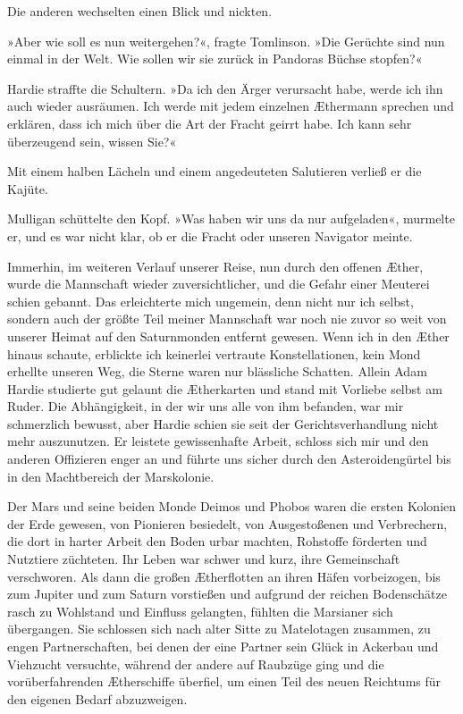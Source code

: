 Die anderen wechselten einen Blick und nickten.

»Aber wie soll es nun weitergehen?«, fragte Tomlinson. »Die
Gerüchte sind nun einmal in der Welt. Wie sollen wir sie zurück in
Pandoras Büchse stopfen?«

Hardie straffte die Schultern. »Da ich den Ärger verursacht habe,
werde ich ihn auch wieder ausräumen. Ich werde mit jedem einzelnen
Æthermann sprechen und erklären, dass ich mich über die Art der
Fracht geirrt habe. Ich kann sehr überzeugend sein, wissen Sie?«

Mit einem halben Lächeln und einem angedeuteten Salutieren verließ
er die Kajüte.

Mulligan schüttelte den Kopf. »Was haben wir uns da nur
aufgeladen«, murmelte er, und es war nicht klar, ob er die Fracht
oder unseren Navigator meinte.

\bigpar

Immerhin, im weiteren Verlauf unserer Reise, nun durch den offenen
Æther, wurde die Mannschaft wieder zuversichtlicher, und die Gefahr
einer Meuterei schien gebannt. Das erleichterte mich ungemein, denn
nicht nur ich selbst, sondern auch der größte Teil meiner
Mannschaft war noch nie zuvor so weit von unserer Heimat auf den
Saturnmonden entfernt gewesen. Wenn ich in den Æther hinaus
schaute, erblickte ich keinerlei vertraute Konstellationen, kein
Mond erhellte unseren Weg, die Sterne waren nur blässliche
Schatten. Allein Adam Hardie studierte gut gelaunt die Ætherkarten
und stand mit Vorliebe selbst am Ruder. Die Abhängigkeit, in der
wir uns alle von ihm befanden, war mir schmerzlich bewusst, aber
Hardie schien sie seit der Gerichtsverhandlung nicht mehr
auszunutzen. Er leistete gewissenhafte Arbeit, schloss sich mir und
den anderen Offizieren enger an und führte uns sicher durch den
Asteroidengürtel bis in den Machtbereich der Marskolonie.

\bigpar

Der Mars und seine beiden Monde Deimos und Phobos waren die ersten
Kolonien der Erde gewesen, von Pionieren besiedelt, von
Ausgestoßenen und Verbrechern, die dort in harter Arbeit den Boden
urbar machten, Rohstoffe förderten und Nutztiere züchteten. Ihr
Leben war schwer und kurz, ihre Gemeinschaft verschworen. Als dann
die großen Ætherflotten an ihren Häfen vorbeizogen, bis zum Jupiter
und zum Saturn vorstießen und aufgrund der reichen Bodenschätze
rasch zu Wohlstand und Einfluss gelangten, fühlten die Marsianer
sich übergangen. Sie schlossen sich nach alter Sitte zu Matelotagen
zusammen, zu engen Partnerschaften, bei denen der eine Partner sein
Glück in Ackerbau und Viehzucht versuchte, während der andere auf
Raubzüge ging und die vorüberfahrenden Ætherschiffe überfiel, um
einen Teil des neuen Reichtums für den eigenen Bedarf abzuzweigen.

